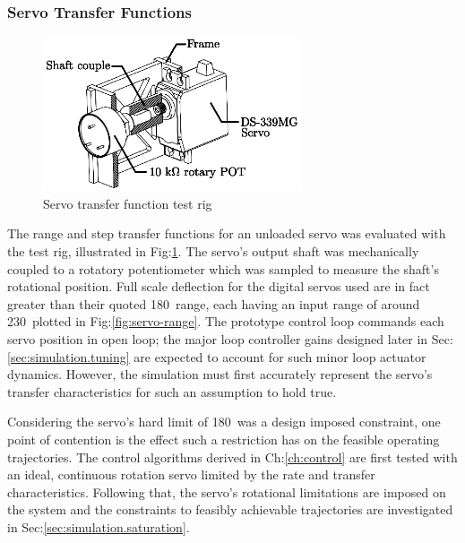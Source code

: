 \subsubsection*{Servo Transfer Functions}
\begin{figure}[htbp]
\centering
\includegraphics[width=0.68\textwidth]{figs/servo-position}
\vspace{-6pt}
\caption{Servo transfer function test rig}
\label{fig:servo-position}
\end{figure}
The range and step transfer functions for an unloaded servo was evaluated with the test rig, illustrated in Fig:\ref{fig:servo-position}. The servo's output shaft was mechanically coupled to a rotatory potentiometer which was sampled to measure the shaft's rotational position. Full scale deflection for the digital servos used are in fact greater than their quoted 180\textdegree ~range, each having an input range of around 230\textdegree ~plotted in Fig:\ref{fig:servo-range}. The prototype control loop commands each servo position in open loop; the major loop controller gains designed later in Sec:\ref{sec:simulation.tuning} are expected to account for such minor loop actuator dynamics. However, the simulation must first accurately represent the servo's transfer characteristics for such an assumption to hold true. 
\par
Considering the servo's hard limit of 180\textdegree ~was a design imposed constraint, one point of contention is the effect such a restriction has on the feasible operating trajectories. The control algorithms derived in Ch:\ref{ch:control} are first tested with an ideal, continuous rotation servo limited by the rate and transfer characteristics. Following that, the servo's rotational limitations are imposed on the system and the constraints to feasibly achievable trajectories are investigated in Sec:\ref{sec:simulation.saturation}.
